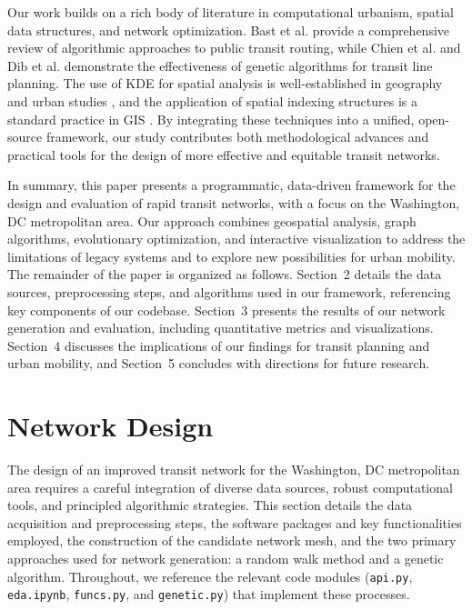 \documentclass[manuscript,screen,review]{acmart}
\begin{document}
Our work builds on a rich body of literature in computational urbanism, spatial data structures, and network optimization. Bast et al. \cite{bib:bast2016route} provide a comprehensive review of algorithmic approaches to public transit routing, while Chien et al. \cite{bib:chien2001genetic} and Dib et al. \cite{bib:dib2017ga} demonstrate the effectiveness of genetic algorithms for transit line planning. The use of KDE for spatial analysis is well-established in geography and urban studies \cite{bib:silverman1986density}, and the application of spatial indexing structures is a standard practice in GIS \cite{bib:samet1984quadtrees}. By integrating these techniques into a unified, open-source framework, our study contributes both methodological advances and practical tools for the design of more effective and equitable transit networks.

In summary, this paper presents a programmatic, data-driven framework for the design and evaluation of rapid transit networks, with a focus on the Washington, DC metropolitan area. Our approach combines geospatial analysis, graph algorithms, evolutionary optimization, and interactive visualization to address the limitations of legacy systems and to explore new possibilities for urban mobility. The remainder of the paper is organized as follows. Section~2 details the data sources, preprocessing steps, and algorithms used in our framework, referencing key components of our codebase. Section~3 presents the results of our network generation and evaluation, including quantitative metrics and visualizations. Section~4 discusses the implications of our findings for transit planning and urban mobility, and Section~5 concludes with directions for future research.

\section{Network Design}

The design of an improved transit network for the Washington, DC metropolitan area requires a careful integration of diverse data sources, robust computational tools, and principled algorithmic strategies. This section details the data acquisition and preprocessing steps, the software packages and key functionalities employed, the construction of the candidate network mesh, and the two primary approaches used for network generation: a random walk method and a genetic algorithm. Throughout, we reference the relevant code modules (\texttt{api.py}, \texttt{eda.ipynb}, \texttt{funcs.py}, and \texttt{genetic.py}) that implement these processes.
\end{document}
